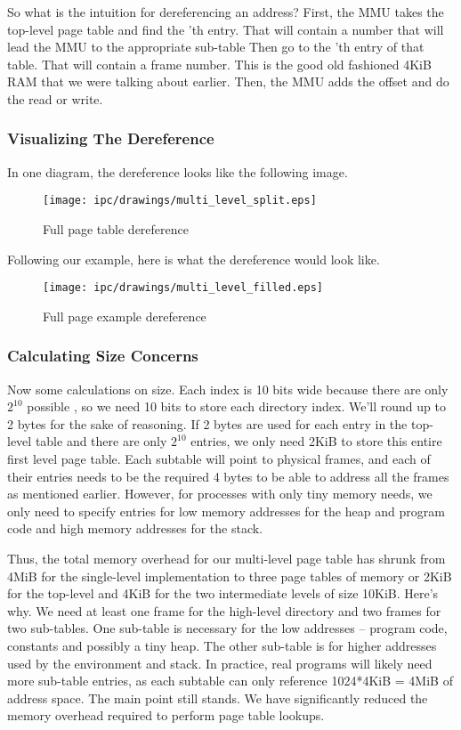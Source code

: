 So what is the intuition for dereferencing an address?
First, the MMU takes the top-level page table and find the 'th entry.
That will contain a number that will lead the MMU to the appropriate sub-table
Then go to the 'th entry of that table.
That will contain a frame number.
This is the good old fashioned 4KiB RAM that we were talking about earlier.
Then, the MMU adds the offset and do the read or write.
	 
\subsubsection{Visualizing The Dereference}
	 
In one diagram, the dereference looks like the following image.
	 
\begin{figure}[H]
	\centering
	\texttt{[image: ipc/drawings/multi\_level\_split.eps]}
	\caption{Full page table dereference}
\end{figure}
	 
Following our example, here is what the dereference would look like.
	 
\begin{figure}[H]
	\centering
	\texttt{[image: ipc/drawings/multi\_level\_filled.eps]}
	\caption{Full page example dereference}
\end{figure}
	 
\subsubsection{Calculating Size Concerns}
	 
Now some calculations on size.
Each  index is 10 bits wide because there are only $2^{10}$ possible , so we need 10 bits to store each directory index.
We'll round up to 2 bytes for the sake of reasoning.
If 2 bytes are used for each entry in the top-level table and there are only $2^{10}$ entries, we only need 2KiB to store this entire first level page table.
Each subtable will point to physical frames, and each of their entries needs to be the required 4 bytes to be able to address all the frames as mentioned earlier.
However, for processes with only tiny memory needs, we only need to specify entries for low memory addresses for the heap and program code and high memory addresses for the stack.
	 
Thus, the total memory overhead for our multi-level page table has shrunk from 4MiB for the single-level implementation to three page tables of memory or 2KiB for the top-level and 4KiB for the two intermediate levels of size 10KiB.
Here's why.
We need at least one frame for the high-level directory and two frames for two sub-tables.
One sub-table is necessary for the low addresses -- program code, constants and possibly a tiny heap.
The other sub-table is for higher addresses used by the environment and stack.
In practice, real programs will likely need more sub-table entries, as each subtable can only reference 1024*4KiB = 4MiB of address space.
The main point still stands.
We have significantly reduced the memory overhead required to perform page table lookups.
	 
